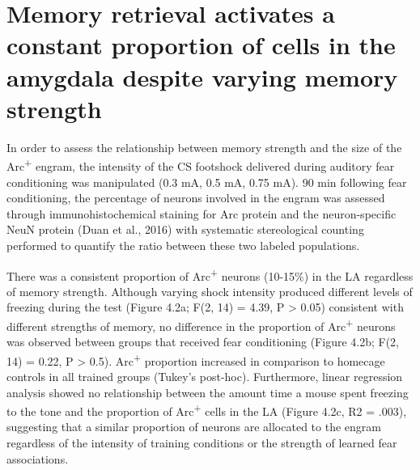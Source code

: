 \documentclass[12pt,a4paperpaper,]{report}
\begin{document}
\section{Memory retrieval activates a constant proportion of cells in
the amygdala despite varying memory
strength}\label{memory-retrieval-activates-a-constant-proportion-of-cells-in-the-amygdala-despite-varying-memory-strength}

In order to assess the relationship between memory strength and the size
of the Arc\textsuperscript{+} engram, the intensity of the CS footshock
delivered during auditory fear conditioning was manipulated (0.3 mA, 0.5
mA, 0.75 mA). 90 min following fear conditioning, the percentage of
neurons involved in the engram was assessed through immunohistochemical
staining for Arc protein and the neuron-specific NeuN protein (Duan et
al., 2016) with systematic stereological counting performed to quantify
the ratio between these two labeled populations.

There was a consistent proportion of Arc\textsuperscript{+} neurons
(10-15\%) in the LA regardless of memory strength. Although varying
shock intensity produced different levels of freezing during the test
(Figure 4.2a; F(2, 14) = 4.39, P \textgreater{} 0.05) consistent with
different strengths of memory, no difference in the proportion of
Arc\textsuperscript{+} neurons was observed between groups that received
fear conditioning (Figure 4.2b; F(2, 14) = 0.22, P \textgreater{} 0.5).
Arc\textsuperscript{+} proportion increased in comparison to homecage
controls in all trained groups (Tukey's post-hoc). Furthermore, linear
regression analysis showed no relationship between the amount time a
mouse spent freezing to the tone and the proportion of
Arc\textsuperscript{+} cells in the LA (Figure 4.2c, R2 = .003),
suggesting that a similar proportion of neurons are allocated to the
engram regardless of the intensity of training conditions or the
strength of learned fear associations.
\end{document}
